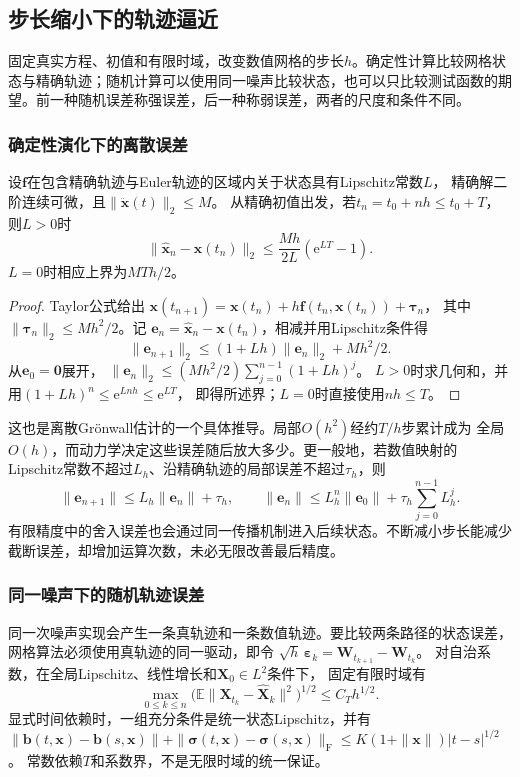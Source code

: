 \subsection{步长缩小下的轨迹逼近}
固定真实方程、初值和有限时域，改变数值网格的步长\(h\)。确定性计算比较网格状态与精确轨迹；随机计算可以使用同一噪声比较状态，也可以只比较测试函数的期望。前一种随机误差称强误差，后一种称弱误差，两者的尺度和条件不同。

\subsubsection{确定性演化下的离散误差}
\begin{theorem}[Euler法的有限时域全局误差]
  \label{thm:dynamical-euler-global-error}
  设$\bm f$在包含精确轨迹与Euler轨迹的区域内关于状态具有Lipschitz常数$L$，
  精确解二阶连续可微，且$\|\ddot{\bm x}(t)\|_2\leq M$。
  从精确初值出发，若$t_n=t_0+nh\leq t_0+T$，则$L>0$时
  \[
    \|\widehat{\bm x}_n-\bm x(t_n)\|_2
      \leq\frac{Mh}{2L}(\mathrm e^{LT}-1).
  \]
  $L=0$时相应上界为$MTh/2$。
\end{theorem}
\begin{proof}
  Taylor公式给出
  $\bm x(t_{n+1})=\bm x(t_n)+h\bm f(t_n,\bm x(t_n))+\bm\tau_n$，
  其中$\|\bm\tau_n\|_2\leq Mh^2/2$。记
  $\bm e_n=\widehat{\bm x}_n-\bm x(t_n)$，相减并用Lipschitz条件得
  \[
    \|\bm e_{n+1}\|_2\leq(1+Lh)\|\bm e_n\|_2+Mh^2/2.
  \]
  从$\bm e_0=\bm0$展开，
  $\|\bm e_n\|_2\leq(Mh^2/2)\sum_{j=0}^{n-1}(1+Lh)^j$。
  $L>0$时求几何和，并用$(1+Lh)^n\leq\mathrm e^{Lnh}\leq\mathrm e^{LT}$，
  即得所述界；$L=0$时直接使用$nh\leq T$。
\end{proof}
这也是离散Grönwall估计的一个具体推导。局部$O(h^2)$经约$T/h$步累计成为
全局$O(h)$，而动力学决定这些误差随后放大多少。更一般地，若数值映射的
Lipschitz常数不超过$L_h$、沿精确轨迹的局部误差不超过$\tau_h$，则
\[
  \|\bm e_{n+1}\|\leq L_h\|\bm e_n\|+\tau_h,\qquad
  \|\bm e_n\|\leq L_h^n\|\bm e_0\|+\tau_h\sum_{j=0}^{n-1}L_h^j.
\]
有限精度中的舍入误差也会通过同一传播机制进入后续状态。不断减小步长能减少
截断误差，却增加运算次数，未必无限改善最后精度。

\subsubsection{同一噪声下的随机轨迹误差}
同一次噪声实现会产生一条真轨迹和一条数值轨迹。要比较两条路径的状态误差，网格算法必须使用真轨迹的同一驱动，即令
$\sqrt h\,\bm\varepsilon_k=\bm W_{t_{k+1}}-\bm W_{t_k}$。
对自治系数，在全局Lipschitz、线性增长和$\bm X_0\in L^2$条件下，
固定有限时域有
\[
 \max_{0\leq k\leq n}
   \bigl(\mathbb E\|\bm X_{t_k}-\widehat{\bm X}_k\|^2\bigr)^{1/2}
     \leq C_T h^{1/2}.
\]
显式时间依赖时，一组充分条件是统一状态Lipschitz，并有
$\|\bm b(t,\bm x)-\bm b(s,\bm x)\|
 +\|\bm\sigma(t,\bm x)-\bm\sigma(s,\bm x)\|_{\mathrm F}
 \leq K(1+\|\bm x\|)|t-s|^{1/2}$。
常数依赖$T$和系数界，不是无限时域的统一保证。

